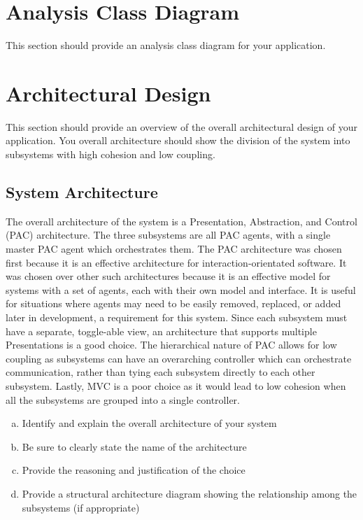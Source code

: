 \documentclass[]{article}
\begin{document}
\section{Analysis Class Diagram}
\label{sec:analysis_class_diagram}
This section should provide an analysis class diagram for your application.


\section{Architectural Design}
\label{sec:architectural_design}
This section should provide an overview of the overall architectural design of your application. You overall architecture should show the division of the system into subsystems with high cohesion and low coupling.

\subsection{System Architecture}
\label{sub:system_architecture}
The overall architecture of the system is a Presentation, Abstraction, and Control (PAC) architecture. The three subsystems are all PAC agents, with a single master PAC agent which orchestrates them. The PAC architecture was chosen first because it is an effective architecture for interaction-orientated software. It was chosen over other such architectures because it is an effective model for systems with a set of agents, each with their own model and interface. It is useful for situations where agents may need to be easily removed, replaced, or added later in development, a requirement for this system. Since each subsystem must have a separate, toggle-able view, an architecture that supports multiple Presentations is a good choice. The hierarchical nature of PAC allows for low coupling as subsystems can have an overarching controller which can orchestrate communication, rather than tying each subsystem directly to each other subsystem. Lastly, MVC is a poor choice as it would lead to low cohesion when all the subsystems are grouped into a single controller.
\begin{enumerate}[a)]
	\item Identify and explain the overall architecture of your system
	\item Be sure to clearly state the name of the architecture
	\item Provide the reasoning and justification of the choice
	\item Provide a structural architecture diagram showing the relationship among the subsystems (if appropriate)
\end{enumerate}
\end{document}
